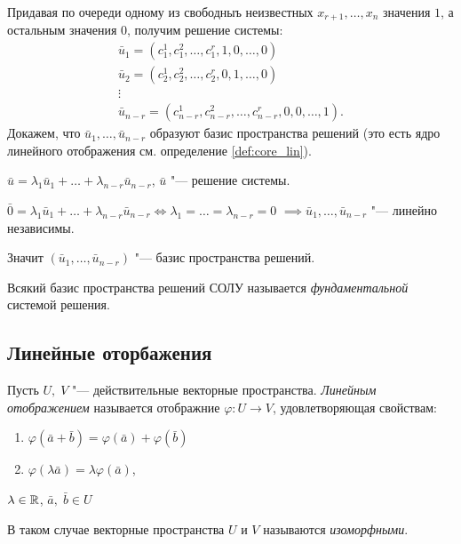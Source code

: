 Придавая по очереди одному из свободныъ неизвестных $x_{r + 1}, \ldots, x_n$ значения $1$, а остальным значения $0$, получим решение системы:
$$
\begin{array}{l}
    \bar{u}_1 = (c_1^1,c_1^2,\ldots,c_1^r,1,0,\ldots,0) \\
    \bar{u}_2 = (c_2^1,c_2^2,\ldots,c_2^r,0,1,\ldots,0) \\
    \vdots \\
    \bar{u}_{n - r} = (c_{n - r}^1, c_{n - r}^2, \ldots, c_{n - r}^r, 0, 0, \ldots, 1).
\end{array}
$$
Докажем, что $\bar{u}_1, \ldots, \bar{u}_{n - r}$ образуют базис пространства решений (это есть ядро линейного отображения см. определение \ref{def:core_lin}).
\begin{Proof}
    $\bar{u} = \lambda_1\bar{u}_1 + \ldots + \lambda_{n - r}\bar{u}_{n - r}$, $\bar{u}$ "--- решение системы.

    $\bar{0} = \lambda_1\bar{u}_1 + \ldots + \lambda_{n - r}\bar{u}_{n - r} \Leftrightarrow \lambda_1 = \ldots = \lambda_{n - r} = 0$
    $\implies \bar{u}_1, \ldots, \bar{u}_{n - r}$ "--- линейно независимы.
    
    Значит $(\bar{u}_1, \ldots, \bar{u}_{n - r})$ "--- базис пространства решений. 
\end{Proof}

\begin{definition}
    Всякий базис пространства решений СОЛУ называется \textit{фундаментальной} системой решения.
\end{definition}

\subsection*{Линейные оторбажения}
\begin{definition}
    Пусть $U,\;V$ "--- действительные векторные пространства.
    \textit{Линейным отображением} называется отображние $\varphi: U \to V$, удовлетворяющая свойствам:
    \begin{enumerate}
        \item $\varphi(\bar{a} + \bar{b}) = \varphi(\bar{a}) + \varphi(\bar{b})$
        \item $\varphi(\lambda\bar{a}) = \lambda\varphi(\bar{a})$,
    \end{enumerate}
    $\lambda \in \mathbb{R}$, $\bar{a},\;\bar{b} \in U$
    
\end{definition}
В таком случае векторные пространства $U$ и $V$ называются \textit{изоморфными}. 

